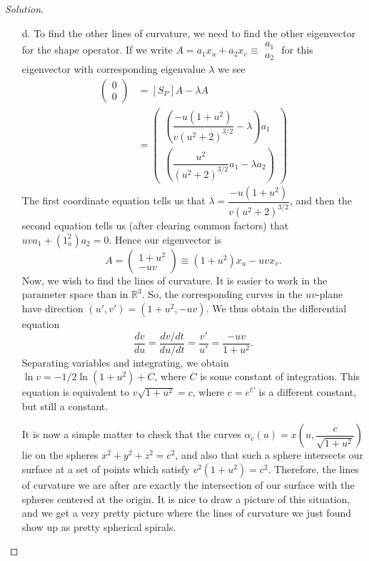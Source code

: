 \documentclass[Shifrin_Solutions_Spring_2015]{subfiles}
\begin{document}
\begin{proof}[Solution]
\begin{itemize}
\item[d.] To find the other lines of curvature, we need to find the other eigenvector for the shape operator. If we write $A = a_1 x_u + a_2 x_v \equiv \begin{smallmatrix} a_1 \\ a_2 \end{smallmatrix}$ for this eigenvector with corresponding eigenvalue $\lambda$ we see
\[
\begin{split}
\begin{pmatrix}0\\0\end{pmatrix} & = \left[ S_P\right] A -\lambda A \\
	& = \begin{pmatrix} \left(\dfrac{-u(1+u^2)}{v(u^2+2)^{3/2}}- \lambda \right)a_1 \\ \left(\dfrac{u^2}{(u^2+2)^{3/2}} a_1 - \lambda a_2\right) \end{pmatrix}
\end{split}
\]
The first coordinate equation tells us that $\lambda = \dfrac{-u(1+u^2)}{v(u^2+2)^{3/2}}$, and then the second equation tells us (after clearing common factors) that $uv a_1 + (1_u^2)a_2 = 0$. Hence our eigenvector is
\[
A = \begin{pmatrix} 1+u^2 \\ -uv \end{pmatrix} \equiv (1+u^2)x_u - uv x_v .
\]
Now, we wish to find the lines of curvature. It is easier to work in the parameter space than in $\mathbb{R}^3$. So, the corresponding curves in the $uv$-plane have direction $(u', v') = (1+u^2, -uv)$. We thus obtain the differential equation
\[
\dfrac{dv}{du} = \dfrac{dv/dt}{du/dt} = \dfrac{v'}{u'} = \dfrac{-uv}{1+u^2} .
\]
Separating variables and integrating, we obtain $\ln v = -1/2 \ln (1+u^2) + C$, where $C$ is some constant of integration. This equation is equivalent to $v\sqrt{1+u^2} = c$, where $c=e^C$ is a different constant, but still a constant.

It is now a simple matter to check that the curves $\alpha_c(u) = x\left(u, \dfrac{c}{\sqrt{1+u^2}}\right)$ lie on the spheres $x^2+y^2+z^2=c^2$, and also that such a sphere intersects our surface at a set of points which satisfy $v^2(1+u^2)  = c^2$. Therefore, the lines of curvature we are after are exactly the intersection of our surface with the spheres centered at the origin. It is nice to draw a picture of this situation, and we get a very pretty picture where the lines of curvature we just found show up as pretty spherical spirals.


\end{itemize}
\end{proof}
\end{document}
